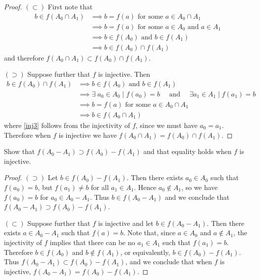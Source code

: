 \documentclass[11pt]{article}
\newenvironment{p}[1]{
  \begin{trivlist}
\item[\hskip \labelsep {\bfseries (#1)}]}
  {\end{trivlist}}
\begin{document}
\begin{proof}
  $(\subset)$ First note that
  \begin{align}
    b \in f(A_0 \cap A_1)
      &\implies b = f(a) \text{ for some } a \in A_0 \cap A_1 \label{im3} \\
      &\implies b = f(a) \text{ for some } a \in A_0 \text{ and } a \in A_1 \label{in1} \\
      &\implies b \in f(A_0) \text{ and } b \in f(A_1) \label{im4} \\
      &\implies b \in f(A_0) \cap f(A_1) \label{in2}
  \end{align}
  and therefore $f(A_0 \cap A_1) \subset f(A_0) \cap f(A_1)$.

  $(\supset)$ Suppose further that $f$ is injective. Then
  \begin{align}
    b \in f(A_0) \cap f(A_1)
      &\implies b \in f(A_0) \text{ and } b \in f(A_1) \nonumber \\
      &\implies
        \exists\; a_0 \in A_0 \mid f(a_0) = b
        \quad \text{ and } \quad
        \exists a_1 \in A_1 \mid f(a_1) = b \nonumber \\
      &\implies b = f(a) \text{ for some } a \in A_0 \cap A_1 \label{inj3} \\
      &\implies b \in f(A_0 \cap A_1) \label{im6} \nonumber
  \end{align}
  where \eqref{inj3} follows from the injectivity of $f$, since we must have
  $a_0 = a_1$. Therefore when $f$ is injective we have $f(A_0 \cap A_1) =
  f(A_0) \cap f(A_1)$.
\end{proof}

\begin{p}{h}
  Show that $f(A_0 - A_1) \supset f(A_0) - f(A_1)$ and that equality holds when
  $f$ is injective.
\end{p}

\begin{proof}
  $(\supset)$ Let $b \in f(A_0) - f(A_1)$. Then there exists $a_0 \in A_0$ such that $f(a_0) = b$, but $f(a_1) \neq b$ for all $a_1 \in A_1$. Hence $a_0 \notin A_1$, so we have $f(a_0) = b$ for $a_0 \in A_0 - A_1$. Thus $b \in f(A_0 - A_1)$ and we conclude that $f(A_0 - A_1) \supset f(A_0) - f(A_1)$.

  $(\subset)$ Suppose further that $f$ is injective and let $b \in f(A_0 -
  A_1)$. Then there exists $a \in A_0 - A_1$ such that $f(a) = b$. Note that,
  since $a \in A_0$ and $a \notin A_1$, the injectivity of $f$ implies that
  there can be no $a_1 \in A_1$ such that $f(a_1) = b$. Therefore $b \in
  f(A_0)$ and $b \notin f(A_1)$, or equivalently, $b \in f(A_0) - f(A_1)$. Thus
  $f(A_0 - A_1) \subset f(A_0) - f(A_1)$, and we conclude that when $f$ is
  injective, $f(A_0 - A_1) = f(A_0) - f(A_1)$.
\end{proof}
\end{document}
